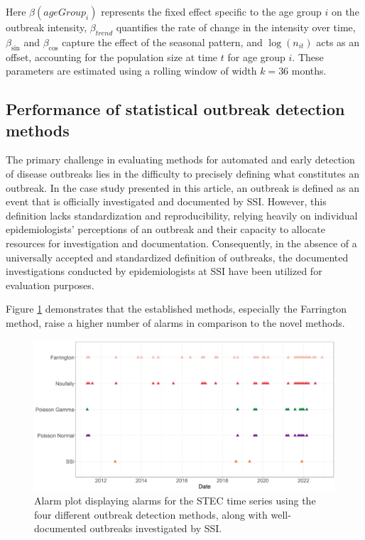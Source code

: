 \documentclass[preprint, 3p, authoryear]{elsarticle} %
\begin{document}
Here \(\beta(ageGroup_i)\) represents the fixed effect specific to the age group \(i\) on the outbreak intensity, \(\beta_{trend}\) quantifies the rate of change in the intensity over time, \(\beta_{\sin}\) and \(\beta_{\cos}\) capture the effect of the seasonal pattern, and \(\log(n_{it})\) acts as an offset, accounting for the population size at time \(t\) for age group \(i\). These parameters are estimated using a rolling window of width \(k=36\) months.

\hypertarget{performance-of-statistical-outbreak-detection-methods}{%
\subsection{Performance of statistical outbreak detection methods}\label{performance-of-statistical-outbreak-detection-methods}}

The primary challenge in evaluating methods for automated and early detection of disease outbreaks lies in the difficulty to precisely defining what constitutes an outbreak. In the case study presented in this article, an outbreak is defined as an event that is officially investigated and documented by SSI. However, this definition lacks standardization and reproducibility, relying heavily on individual epidemiologists' perceptions of an outbreak and their capacity to allocate resources for investigation and documentation. Consequently, in the absence of a universally accepted and standardized definition of outbreaks, the documented investigations conducted by epidemiologists at SSI have been utilized for evaluation purposes.

Figure \ref{fig:CompareAlarms} demonstrates that the established methods, especially the Farrington method, raise a higher number of alarms in comparison to the novel methods.



\begin{figure}[H]
\includegraphics[width=1\linewidth]{../../figures/Compare_alarms_95} \caption{Alarm plot displaying alarms for the STEC time series using the four different outbreak detection methods, along with well-documented outbreaks investigated by SSI.}\label{fig:CompareAlarms}
\end{figure}
\end{document}
